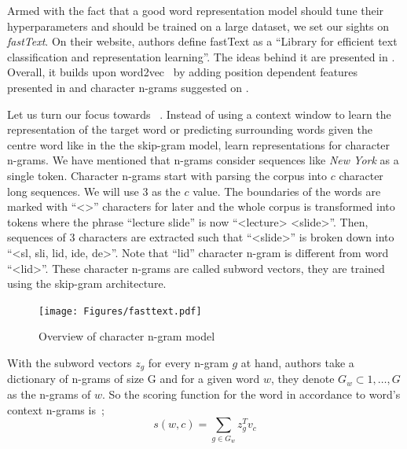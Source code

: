 Armed with the fact that a good word representation model should tune their hyperparameters and should be trained on a large dataset, we set our sights on \emph{fastText}.
On their website, authors define fastText as a \enquote{Library for efficient text classification and representation learning}.
The ideas behind it are presented in \textcite{mikolov2018advances}.
Overall, it builds upon word2vec~\cite{mikolov_distributed_2013} by adding position dependent features presented in \textcite{mnih_learning_2013} and character n-grams suggested on \textcite{bojanowski_enriching_2016}.

Let us turn our focus towards ~\cite{bojanowski_enriching_2016}.
Instead of using a context window to learn the representation of the target word or predicting surrounding words given the centre word like in the the skip-gram model, \citeauthor{bojanowski_enriching_2016} learn representations for character n-grams.
We have mentioned that n-grams consider sequences like \emph{New York} as a single token.
Character n-grams start with parsing the corpus into $c$ character long sequences.
We will use 3 as the $c$ value.
The boundaries of the words are marked with \enquote{<>} characters for later and the whole corpus is transformed into tokens where the phrase \enquote{lecture slide} is now \enquote{<lecture> <slide>}.
Then, sequences of 3 characters are extracted such that \enquote{<slide>} is broken down into \enquote{<sl, sli, lid, ide, de>}.
Note that \enquote{lid} character n-gram is different from word \enquote{<lid>}.
These character n-grams are called subword vectors, they are trained using the skip-gram architecture.

\begin{figure}[htbp]
    \centering
    \texttt{[image: Figures/fasttext.pdf]}
    \caption{Overview of character n-gram model}%
    \label{fig:fasttext}
\end{figure}

With the subword vectors $z_g$ for every n-gram $g$ at hand, authors take a dictionary of n-grams of size G and for a given word $w$, they denote $G_{w} \subset {1, \dots, G}$ as the n-grams of $w$.
So the scoring function for the word in accordance to word's context n-grams is~\cite{bojanowski_enriching_2016};
\begin{displaymath}
    s(w,c) = \sum_{g \in G_{w}}z_{g}^T v_c
\end{displaymath}

